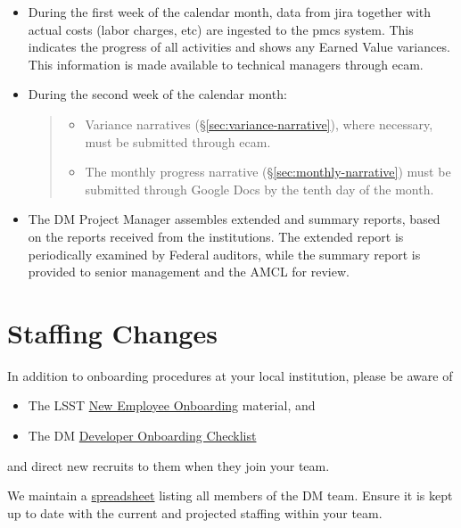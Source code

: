 \begin{itemize}
\item
  During the first week of the calendar month, data from \gls{jira} together with actual costs (labor charges, etc) are ingested to the \gls{pmcs} system.
  This indicates the progress of all activities and shows any Earned Value variances.
  This information is made available to technical managers through \gls{ecam}.
\item
  During the second week of the calendar month:

  \begin{quote}
  \begin{itemize}
  \item
    Variance narratives (\S\ref{sec:variance-narrative}), where necessary, must be submitted through \gls{ecam}.
  \item
    The monthly progress narrative (\S\ref{sec:monthly-narrative}) must be submitted through Google Docs by the tenth day of the month.
  \end{itemize}
  \end{quote}
\item
  The DM Project Manager assembles extended and summary reports, based
  on the reports received from the institutions. The extended report is
  periodically examined by Federal auditors, while the summary report is
  provided to senior management and the AMCL for review.
\end{itemize}

\section{Staffing Changes}\label{staffing-changes}

In addition to onboarding procedures at your local institution, please
be aware of

\begin{itemize}
\item
  The LSST \href{https://project.lsst.org/onboarding}{New Employee
  Onboarding} material, and
\item
  The DM
  \href{https://developer.lsst.io/getting-started/onboarding.html}{Developer
  Onboarding Checklist}
\end{itemize}

and direct new recruits to them when they join your team.

We maintain a
\href{https://docs.google.com/spreadsheets/d/1G9KXBJJHfWkVDQeApfXaN_nZjD_YUJlHiEDOzhTy-0c/edit?usp=drive_web}{spreadsheet}
listing all members of the DM team. Ensure it is kept up to date with
the current and projected staffing within your team.
